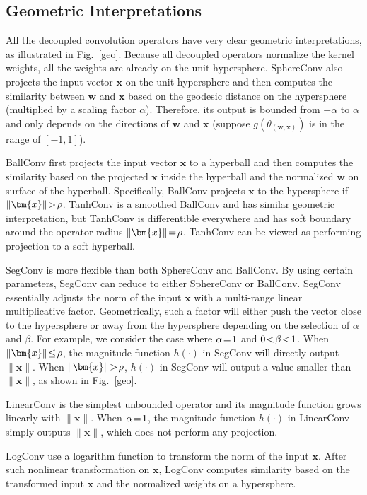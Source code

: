\subsection{Geometric Interpretations}\label{geo_sec}
All the decoupled convolution operators have very clear geometric interpretations, as illustrated in Fig.~\ref{geo}. Because all decoupled operators normalize the kernel weights, all the weights are already on the unit hypersphere. SphereConv also projects the input vector $\bm{x}$ on the unit hypersphere and then computes the similarity between $\bm{w}$ and $\bm{x}$ based on the geodesic distance on the hypersphere (multiplied by a scaling factor $\alpha$). Therefore, its output is bounded from $-\alpha$ to $\alpha$ and only depends on the directions of $\bm{w}$ and $\bm{x}$ (suppose $g(\theta_{(\bm{w}, \bm{x})})$ is in the range of $[-1,1]$).
\par
BallConv first projects the input vector $\bm{x}$ to a hyperball and then computes the similarity based on the projected $\bm{x}$ inside the hyperball and the normalized $\bm{w}$ on surface of the hyperball. Specifically, BallConv projects $\bm{x}$ to the hypersphere if $\thickmuskip=2mu \medmuskip=2mu \left\lVert\bm{x}\right\rVert>\rho$. TanhConv is a smoothed BallConv and has similar geometric interpretation, but TanhConv is differentible everywhere and has soft boundary around the operator radius $\thickmuskip=2mu \medmuskip=2mu \|\bm{x}\|=\rho$. TanhConv can be viewed as performing projection to a soft hyperball.
\par
SegConv is more flexible than both SphereConv and BallConv. By using certain parameters, SegConv can reduce to either SphereConv or BallConv. SegConv essentially adjusts the norm of the input $\bm{x}$ with a multi-range linear multiplicative factor. Geometrically, such a factor will either push the vector close to the hypersphere or away from the hypersphere depending on the selection of $\alpha$ and $\beta$. For example, we consider the case where $\thickmuskip=2mu \medmuskip=2mu \alpha=1$ and $\thickmuskip=2mu \medmuskip=2mu 0<\beta<1$. When $\thickmuskip=2mu \medmuskip=2mu \|\bm{x}\|\leq \rho$, the magnitude function $h(\cdot)$ in SegConv will directly output $\|\bm{x}\|$. When $\thickmuskip=2mu \medmuskip=2mu \|\bm{x}\|> \rho$, $h(\cdot)$ in SegConv will output a value smaller than $\|\bm{x}\|$, as shown in Fig.~\ref{geo}.
\par
LinearConv is the simplest unbounded operator and its magnitude function grows linearly with $\|\bm{x}\|$. When $\thickmuskip=2mu \medmuskip=2mu \alpha=1$, the magnitude function $h(\cdot)$ in LinearConv simply outputs $\|\bm{x}\|$, which does not perform any projection.
\par
LogConv use a logarithm function to transform the norm of the input $\bm{x}$. After such nonlinear transformation on $\bm{x}$, LogConv computes similarity based on the transformed input $\bm{x}$ and the normalized weights on a hypersphere.

